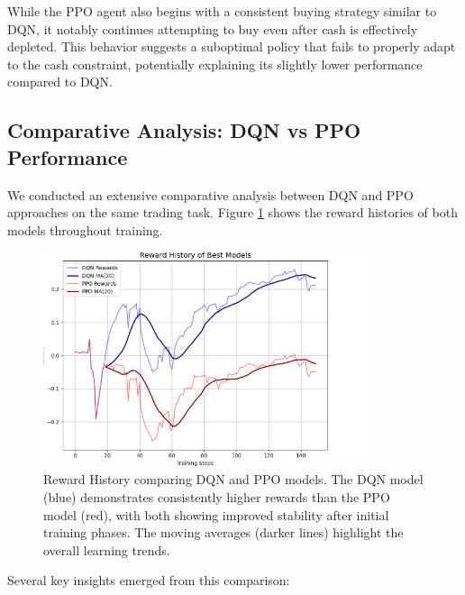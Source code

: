 \documentclass[11pt]{article}
\begin{document}
While the PPO agent also begins with a consistent buying strategy similar to DQN, it notably continues attempting to buy even after cash is effectively depleted. This behavior suggests a suboptimal policy that fails to properly adapt to the cash constraint, potentially explaining its slightly lower performance compared to DQN.

\subsection{Comparative Analysis: DQN vs PPO Performance}
We conducted an extensive comparative analysis between DQN and PPO approaches on the same trading task. Figure \ref{fig:reward_history} shows the reward histories of both models throughout training.

\begin{figure}[h]
  \centering
  \includegraphics[width=0.85\textwidth]{fig/Reward History Best Model.png}
  \caption{Reward History comparing DQN and PPO models. The DQN model (blue) demonstrates consistently higher rewards than the PPO model (red), with both showing improved stability after initial training phases. The moving averages (darker lines) highlight the overall learning trends.}
  \label{fig:reward_history}
\end{figure}

Several key insights emerged from this comparison:
\end{document}
